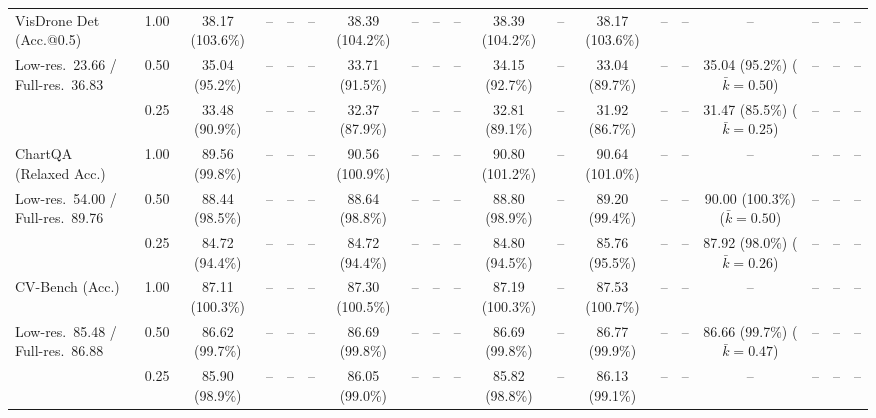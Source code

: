\begin{table}[t]
{\begin{tabular}{l c | c c c c | c c c c | c c | c c c | c c c c}
\cmidrule(lr){1-19}
VisDrone Det (Acc.@0.5) & 1.00 & \cellcolor{gray!15}38.17 (103.6\%) & -- & -- & -- & \cellcolor{gray!15}38.39 (104.2\%) & -- & -- & -- & \cellcolor{gray!15}38.39 (104.2\%) & -- & \cellcolor{gray!15}38.17 (103.6\%) & -- & -- & -- & -- & -- & -- \\
{\footnotesize Low-res.\ 23.66 / Full-res.\ 36.83} & 0.50 & 35.04 (95.2\%) & -- & -- & -- & 33.71 (91.5\%) & -- & -- & -- & 34.15 (92.7\%) & -- & 33.04 (89.7\%) & -- & -- & 35.04 (95.2\%) {\footnotesize ($\bar k{=}0.50$)} & -- & -- & -- \\
 & 0.25 & 33.48 (90.9\%) & -- & -- & -- & 32.37 (87.9\%) & -- & -- & -- & 32.81 (89.1\%) & -- & 31.92 (86.7\%) & -- & -- & 31.47 (85.5\%) {\footnotesize ($\bar k{=}0.25$)} & -- & -- & -- \\
\cmidrule(lr){1-19}
ChartQA (Relaxed Acc.) & 1.00 & \cellcolor{gray!15}89.56 (99.8\%) & -- & -- & -- & \cellcolor{gray!15}90.56 (100.9\%) & -- & -- & -- & \cellcolor{gray!15}90.80 (101.2\%) & -- & \cellcolor{gray!15}90.64 (101.0\%) & -- & -- & -- & -- & -- & -- \\
{\footnotesize Low-res.\ 54.00 / Full-res.\ 89.76} & 0.50 & \cellcolor{gray!15}88.44 (98.5\%) & -- & -- & -- & \cellcolor{gray!15}88.64 (98.8\%) & -- & -- & -- & \cellcolor{gray!15}88.80 (98.9\%) & -- & \cellcolor{gray!15}89.20 (99.4\%) & -- & -- & \cellcolor{gray!15}90.00 (100.3\%) {\footnotesize ($\bar k{=}0.50$)} & -- & -- & -- \\
 & 0.25 & 84.72 (94.4\%) & -- & -- & -- & 84.72 (94.4\%) & -- & -- & -- & 84.80 (94.5\%) & -- & 85.76 (95.5\%) & -- & -- & 87.92 (98.0\%) {\footnotesize ($\bar k{=}0.26$)} & -- & -- & -- \\
\cmidrule(lr){1-19}
CV-Bench (Acc.) & 1.00 & \cellcolor{gray!15}87.11 (100.3\%) & -- & -- & -- & \cellcolor{gray!15}87.30 (100.5\%) & -- & -- & -- & \cellcolor{gray!15}87.19 (100.3\%) & -- & \cellcolor{gray!15}87.53 (100.7\%) & -- & -- & -- & -- & -- & -- \\
{\footnotesize Low-res.\ 85.48 / Full-res.\ 86.88} & 0.50 & \cellcolor{gray!15}86.62 (99.7\%) & -- & -- & -- & \cellcolor{gray!15}86.69 (99.8\%) & -- & -- & -- & \cellcolor{gray!15}86.69 (99.8\%) & -- & \cellcolor{gray!15}86.77 (99.9\%) & -- & -- & \cellcolor{gray!15}86.66 (99.7\%) {\footnotesize ($\bar k{=}0.47$)} & -- & -- & -- \\
 & 0.25 & \cellcolor{gray!15}85.90 (98.9\%) & -- & -- & -- & \cellcolor{gray!15}86.05 (99.0\%) & -- & -- & -- & \cellcolor{gray!15}85.82 (98.8\%) & -- & \cellcolor{gray!15}86.13 (99.1\%) & -- & -- & -- & -- & -- & -- \\

\end{tabular}}
\end{table}
